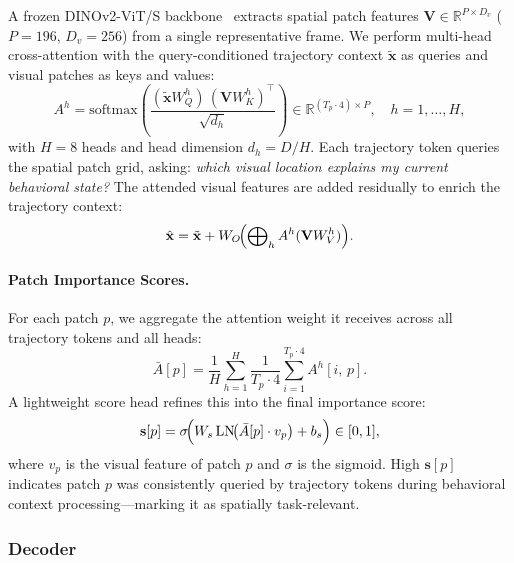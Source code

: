 A frozen DINOv2-ViT/S backbone~\cite{oquab2023dinov2} extracts spatial patch features
$\mathbf{V} \in \mathbb{R}^{P \times D_v}$ ($P{=}196$, $D_v{=}256$)
from a single representative frame.
We perform multi-head cross-attention with the query-conditioned trajectory context
$\tilde{\mathbf{x}}$ as queries and visual patches as keys and values:
\begin{equation}
    A^h = \mathrm{softmax}\!\left(
        \frac{(\tilde{\mathbf{x}} W_Q^h)\,(\mathbf{V} W_K^h)^\top}{\sqrt{d_h}}
    \right) \in \mathbb{R}^{(T_p \cdot 4) \times P}, \quad h = 1,\ldots,H,
    \label{eq:cross_attn}
\end{equation}
with $H{=}8$ heads and head dimension $d_h = D/H$.
Each trajectory token queries the spatial patch grid, asking:
\emph{which visual location explains my current behavioral state?}
The attended visual features are added residually to enrich the trajectory context:
\begin{equation}
    \hat{\mathbf{x}} = \tilde{\mathbf{x}} + W_O\!\Bigl(\bigoplus\nolimits_{h} A^h (\mathbf{V} W_V^h)\Bigr).
    \label{eq:enriched}
\end{equation}

\paragraph{Patch Importance Scores.}
For each patch $p$, we aggregate the attention weight it receives across all trajectory
tokens and all heads:
\begin{equation}
    \bar{A}[p] = \frac{1}{H} \sum_{h=1}^{H}
                  \frac{1}{T_p \cdot 4} \sum_{i=1}^{T_p \cdot 4} A^h[i,\, p].
    \label{eq:mean_attn}
\end{equation}
A lightweight score head refines this into the final importance score:
\begin{equation}
    \mathbf{s}[p] = \sigma\!\Bigl(
        W_s\, \mathrm{LN}\!\bigl(\bar{A}[p] \cdot v_p\bigr) + b_s
    \Bigr) \in [0,1],
    \label{eq:score}
\end{equation}
where $v_p$ is the visual feature of patch $p$ and $\sigma$ is the sigmoid.
High $\mathbf{s}[p]$ indicates patch $p$ was consistently queried by trajectory
tokens during behavioral context processing—marking it as spatially task-relevant.


\subsubsection{Decoder}
\label{sec:decoder}

